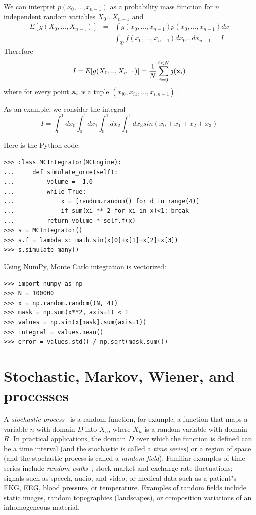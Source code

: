 \documentclass[justified, sixbynine]{tufte-book}
\theoremstyle{plain}%
\newtheorem * {corollary}{Corollary}
\theoremstyle{definition}
\theoremstyle{remark}
\newtheorem * {remark}{Remark}
\newtheorem * {note}{Note}
\begin{document}
\begin{fullwidth}
We can interpret $p(x_0, ..., x_{n-1})$ as a probability mass function for $n$
independent random variables $X_0$...$X_{n-1}$ and
\begin{eqnarray}
E[g(X_0, ..., X_{n-1})] &=&\int g(x_0, ..., x_{n-1})p(x_0, ..., x_{n-1})dx \\
&=&\int_{{\mathfrak D}}f(x_0, ..., x_{n-1})dx_0...dx_{n-1}=I
\end{eqnarray}
Therefore
\begin{equation}
I=E[g(X_0, .., X_{n-1})] = \frac 1N\sum_{i=0}^{i<N}g({\bf x}_i)
\end{equation}
where for every point ${\bf x}_i$ is a tuple $(x_{i0}, x_{i1}, ..., x_{i, n-1})$.

As an example, we consider the integral
\begin{equation}
I = \int_0^1 dx_0 \int_0^1 dx_1 \int_0^1 dx_2 \int_0^1 dx_3 sin(x_0+x_1+x_2+x_3)
\end{equation}

Here is the Python code:
\begin{lstlisting}
>>> class MCIntegrator(MCEngine):
...     def simulate_once(self):
...         volume =  1.0
...         while True:
...             x = [random.random() for d in range(4)]
...             if sum(xi ** 2 for xi in x)<1: break
...         return volume * self.f(x)
>>> s = MCIntegrator()
>>> s.f = lambda x: math.sin(x[0]+x[1]+x[2]+x[3])
>>> s.simulate_many()
\end{lstlisting}

Using NumPy, Monte Carlo integration is vectorized:

\begin{lstlisting}
>>> import numpy as np
>>> N = 100000
>>> x = np.random.random((N, 4))
>>> mask = np.sum(x**2, axis=1) < 1
>>> values = np.sin(x[mask].sum(axis=1))
>>> integral = values.mean()
>>> error = values.std() / np.sqrt(mask.sum())
\end{lstlisting}

\goodbreak\section{Stochastic, Markov, Wiener, and processes}


A {\it stochastic process}~\cite{stochastic} is a random function, 
for example, a function that maps a
variable $n$ with domain $D$ into $X_n$, where $X_n$ is a random variable
with domain $R$. In practical applications, the domain $D$ over which the
function is defined can be a time interval (and the stochastic is called a
{\it time series}) or a region of space (and the stochastic process is
called a {\it random field}). Familiar examples of time series include {\it %
random walks}~\cite{rwalk}; stock market and exchange rate fluctuations; signals such as
speech, audio, and video; or medical data such as a patient"s EKG, EEG, blood
pressure, or temperature. Examples of random fields include static images, 
random topographies (landscapes), or composition variations of an
inhomogeneous material.


\end{fullwidth}
\end{document}
